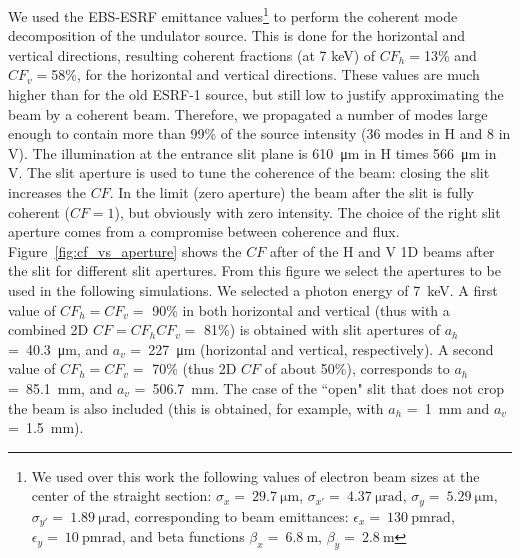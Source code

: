 \documentclass{iucr}              %
\begin{document}
We used the EBS-ESRF emittance values\footnote{We used over this work the following values of electron beam sizes at the center of the straight section: $\sigma_x=~\SI{29.7}{\micro\meter}$,
$\sigma_{x'}=~\SI{4.37}{\micro\radian}$,
$\sigma_y=~\SI{5.29}{\micro\meter}$,
$\sigma_{y'}=~\SI{1.89}{\micro\radian}$, corresponding to beam emittances:  $\epsilon_x=~\SI{130}{\pico\meter \radian}$,
$\epsilon_y=~\SI{10}{\pico\meter \radian}$, and beta functions
$\beta_x=~\SI{6.8}{\meter}$,
$\beta_y=~\SI{2.8}{\meter}$
}
to perform the coherent mode decomposition of the undulator source.
This is done for the horizontal and vertical directions, resulting coherent fractions (at 7 keV) of $CF_h=$13\% and $CF_v=$58\%, for the horizontal and vertical directions. These values are much higher than for the old ESRF-1 source, but still low to justify approximating the beam by a coherent beam. Therefore, we propagated a number of modes large enough to contain more than 99\% of the source intensity (36 modes in H and 8 in V). The illumination at the entrance slit plane is \SI{610}{\micro\meter} in H times \SI{566}{\micro\meter} in V. The slit aperture is used to tune the coherence of the beam: closing the slit increases the $CF$. In the limit (zero aperture) the beam after the slit is fully coherent ($CF=1$), but obviously with zero intensity. The choice of the right slit aperture comes from a compromise between coherence and flux. Figure~\ref{fig:cf_vs_aperture} shows the $CF$ after of the H and V 1D beams after the slit for different slit apertures. From this figure we select the apertures to be used in the following simulations. We selected a photon energy of \SI{7}{keV}. A first value of $CF_h=CF_v=$ 90\% in both horizontal and vertical (thus with a combined 2D  $CF=CF_h CF_v=$ 81\%) is obtained with slit apertures of
$a_h$ =~\SI{40.3}{\micro\meter}, and 
$a_v$ =~\SI{227}{\micro\meter} (horizontal and vertical, respectively). A second value of  $CF_h=CF_v=$ 70\% (thus 2D $CF$ of about 50\%), corresponds to 
$a_h$ =~\SI{85.1}{\milli\meter}, and 
$a_v$ =~\SI{506.7}{\milli\meter}. The case of the ``open" slit that does not crop the beam is also included (this is obtained, for example, with $a_h$ =~\SI{1}{\milli\meter} and $a_v$ =~\SI{1.5}{\milli\meter}).
\end{document}
